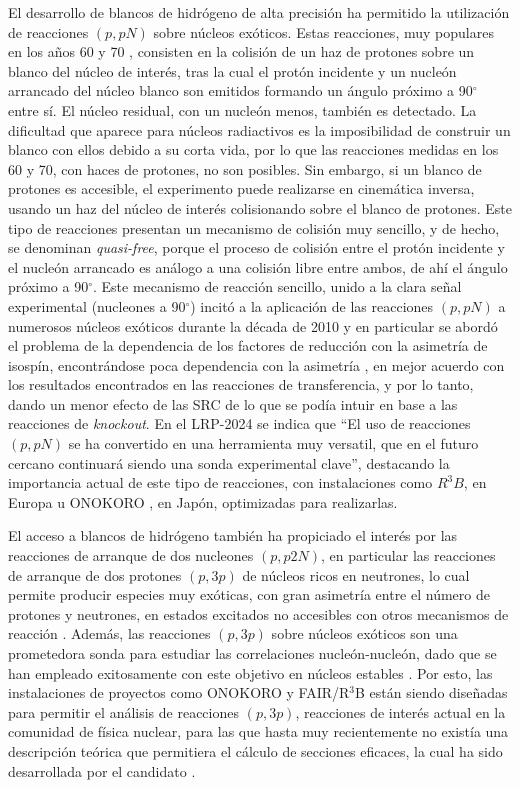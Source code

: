 \documentclass[a4paper,12pt,twoside]{article}
\begin{document}
El desarrollo de blancos de hidrógeno de alta precisión \cite{Obe14,Pan16,Liu23} ha permitido la utilización de reacciones $(p,pN)$ sobre núcleos exóticos. Estas reacciones, muy populares en los años 60 y 70 \cite{Jac66}, consisten en la colisión de un haz de protones sobre un blanco del núcleo de interés, tras la cual el protón incidente y un nucleón arrancado del núcleo blanco son emitidos formando un ángulo próximo a 90$^\circ$ entre sí. El núcleo residual, con un nucleón menos, también es detectado. La dificultad que aparece para núcleos radiactivos es la imposibilidad de construir un blanco con ellos debido a su corta vida, por lo que las reacciones medidas en los 60 y 70, con haces de protones, no son posibles. Sin embargo, si un blanco de protones es accesible, el experimento puede realizarse en cinemática inversa, usando un haz del núcleo de interés colisionando sobre el blanco de protones. Este tipo de reacciones presentan un mecanismo de colisión muy sencillo, y de hecho, se denominan \textit{quasi-free}, porque el proceso de colisión entre el protón incidente y el nucleón arrancado es análogo a una colisión libre entre ambos, de ahí el ángulo próximo a 90$^\circ$. Este mecanismo de reacción sencillo, unido a la clara señal experimental (nucleones a 90$^\circ$) incitó a la aplicación de las reacciones $(p,pN)$ a numerosos núcleos exóticos durante la década de 2010 \cite{Ata18,Kaw18,Pau19,Hol19} y en particular se abordó el problema de la dependencia de los factores de reducción con la asimetría de isospín, encontrándose poca dependencia con la asimetría \cite{Ata18,Kaw18}, en mejor acuerdo con los resultados encontrados en las reacciones de transferencia, y por lo tanto, dando un menor efecto de las SRC de lo que se podía intuir en base a las reacciones de \textit{knockout}. En el LRP-2024 se indica que ``El uso de reacciones $(p, pN)$ se ha convertido en una herramienta muy versatil, que en el futuro cercano continuará siendo una sonda experimental clave'', destacando la importancia actual de este tipo de reacciones, con instalaciones como $R^3B$, en Europa \cite{r3b24} u ONOKORO \cite{onokoro}, en Japón, optimizadas para realizarlas.

El acceso a blancos de hidrógeno también ha propiciado el interés por las reacciones de arranque de dos nucleones $(p,p2N)$, en particular las reacciones de arranque de dos protones $(p,3p)$ de núcleos ricos en neutrones, lo cual permite producir especies muy exóticas, con gran asimetría entre el número de protones y neutrones, en estados excitados no accesibles con otros mecanismos de reacción \cite{Tan19}. Además, las reacciones $(p,3p)$ sobre núcleos exóticos son una prometedora sonda para estudiar las correlaciones nucleón-nucleón, dado que se han empleado exitosamente con este objetivo en núcleos estables \cite{Pia06}. Por esto, las instalaciones de proyectos como ONOKORO \cite{onokoro} y FAIR/R$^3$B \cite{r3b24,nupecc} están siendo diseñadas para permitir el análisis de reacciones $(p,3p)$, reacciones de interés actual en la comunidad de física nuclear, para las que hasta muy recientemente no existía una descripción teórica que permitiera el cálculo de secciones eficaces, la cual ha sido desarrollada por el candidato \cite{p3p}.
\end{document}
